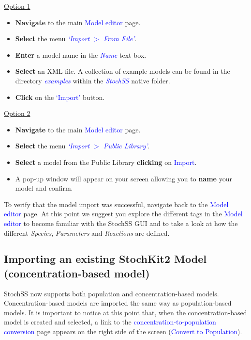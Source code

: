 \underline{Option 1}
\begin{itemize}
  \item \textbf{Navigate} to the main \textcolor{blue}{Model editor} page.
  \item \textbf{Select} the menu \textcolor{blue}{\textit{`Import $>$ From File'}}.
  \item \textbf{Enter} a model name in the \textcolor{blue}{\textit{Name}} text box.
  \item \textbf{Select} an XML file. A collection of example models can be found in the directory \textcolor{blue}{\textit{examples}} within the \textcolor{blue}{\textit{StochSS}} native folder.
  \item \textbf{Click} on the \textcolor{blue}{`Import'} button.
\end{itemize}

\underline{Option 2}
\begin{itemize}
  \item \textbf{Navigate} to the main \textcolor{blue}{Model editor} page.
  \item \textbf{Select} the menu \textcolor{blue}{\textit{`Import $>$ Public Library'}}.
  \item \textbf{Select} a model from the Public Library \textbf{clicking} on \textcolor{blue}{Import}.
  \item A pop-up window will appear on your screen allowing you to \textbf{name} your model and confirm.
\end{itemize}

To verify that the model import was successful, navigate back to the \textcolor{blue}{Model editor} page. At this point we suggest you explore the different tags in the \textcolor{blue}{Model editor} to become familiar with the StochSS GUI and to take a look at how the different \textit{Species}, \textit{Parameters} and \textit{Reactions} are defined.

\subsection{Importing an existing StochKit2 Model (concentration-based model)}
StochSS now supports both population and concentration-based models. Concentration-based models are imported the same way as population-based models.
It is important to notice at this point that, when the concentration-based model is created and selected, a link to the \textcolor{blue}{concentration-to-population conversion} page appears on the right side of the screen (\textcolor{blue}{Convert to Population}).

